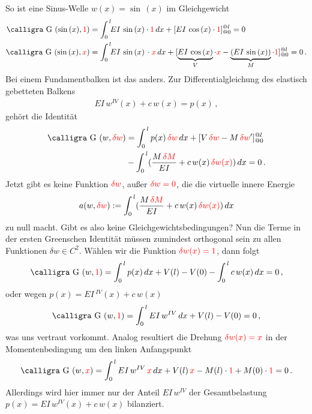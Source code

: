 {{{{{So ist eine Sinus-Welle $w(x) = \sin\, (x)$ im Gleichgewicht
\begin{align}
\text{\normalfont\calligra G\,\,}(\sin\,(x),\textcolor{red}{1}) &= \int_0^{\,l}\!\!EI\,\sin\,(x)\cdot \textcolor{red}{1}\,dx + [EI\,\cos\,(x) \cdot \textcolor{red}{1}]_{@0}^{@l} = 0\\
\text{\normalfont\calligra G\,\,}(\sin\,(x),\textcolor{red}{x}) &= \int_0^{\,l}\!\!EI\,\sin\,(x)\,\cdot \textcolor{red}{x} \,dx + [\underbrace{EI\,\cos\,(x)}_{V} \cdot \textcolor{red}{x} - \underbrace{( EI\,\sin\,(x))}_{M}\cdot \textcolor{red}{1}]_{@0}^{@l} = 0\,.
\end{align}
Bei einem Fundamentbalken ist das anders. Zur Differentialgleichung des elas\-tisch gebetteten Balkens
\begin{align}
EI\,w^{IV}(x) + c\,w(x) = p(x)\,,
\end{align}
geh\"{o}rt die Identit\"{a}t
\begin{align}
\text{\normalfont\calligra G\,\,}(w,\textcolor{red}{\delta w}) &= \int_0^{\,l} p(x)\,\textcolor{red}{\delta w}\,dx + [V\,\textcolor{red}{\delta w} - M\,\textcolor{red}{\delta w}']_{@0}^{@l} \nn  \\
&- \int_0^{\,l}(\frac{M\,\textcolor{red}{\delta M}}{EI} + c\,w(x)\,\textcolor{red}{\delta w(x)}
)\,dx = 0\,.
\end{align}
Jetzt gibt es keine Funktion $\textcolor{red}{\delta w} $, au{\ss}er $\textcolor{red}{\delta w = 0} $, die die virtuelle innere Energie
\begin{align}
a(w,\textcolor{red}{\delta w}) := \int_0^{\,l}(\frac{M\,\textcolor{red}{\delta M}}{EI} + c\,w(x)\,\textcolor{red}{\delta w(x)})\,dx
\end{align}
zu null macht. Gibt es also keine Gleichgewichtsbedingungen? Nun die Terme in der ersten Greenschen Identit\"{a}t m\"{u}ssen zumindest orthogonal sein zu allen Funktionen $\delta w \in C^2 $. W\"{a}hlen wir die Funktion $\textcolor{red}{\delta w(x) = 1} $, dann folgt
\begin{align}
\text{\normalfont\calligra G\,\,}(w,\textcolor{red}{1}) = \int_0^{\,l} p(x)\,dx + V(l) - V(0) - \int_0^{\,l} c\,w(x)\,dx = 0\,,
\end{align}
oder wegen $p(x) = EI\,^{IV}(x) + c\,w(x)$
\begin{align}
\text{\normalfont\calligra G\,\,}(w,\textcolor{red}{1}) = \int_0^{\,l} EI\,w^{IV}\,dx + V(l) - V(0) = 0\,,
\end{align}
was uns vertraut vorkommt. Analog resultiert die Drehung $\textcolor{red}{\delta w(x) = x}$ in der Momentenbedingung um den linken Anfangspunkt
\begin{align}
\text{\normalfont\calligra G\,\,}(w,\textcolor{red}{x}) = \int_0^{\,l} EI\,w^{IV}\,\textcolor{red}{x}\,dx + V(l)\,\textcolor{red}{x}  - M(l) \cdot \textcolor{red}{1} + M(0)\cdot \textcolor{red}{1} = 0\,.
\end{align}
Allerdings wird hier immer nur der Anteil $EI\,w^{IV} $ der Gesamtbelastung $p(x) = EI\,w^{IV}(x) + c\,w(x) $ bilanziert.


}}}}}
